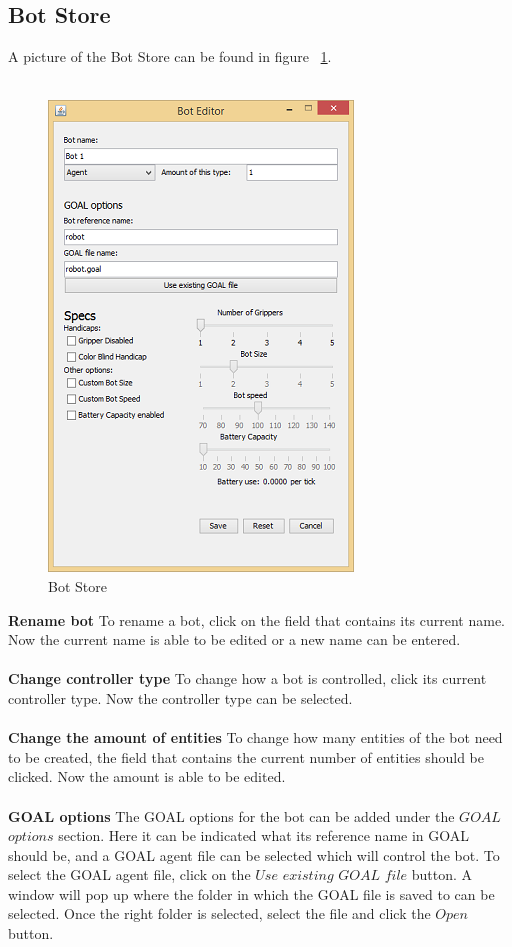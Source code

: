 \subsection{Bot Store}
A picture of the Bot Store can be found in figure ~\ref{fig:bs}.\\\\
\begin{figure}[h]
\begin{center}
\includegraphics{NewFeatures/bs.png}
\end{center}
\caption{Bot Store}
\label{fig:bs}
\end{figure}
\textbf{Rename bot}
To rename a bot, click on the field that contains its current name. Now the current name is able to be edited or a new name can be entered.
\\\\
\textbf{Change controller type}
To change how a bot is controlled, click its current controller type. Now the controller type can be selected.
\\\\
\textbf{Change the amount of entities}
To change how many entities of the bot need to be created, the field that contains the current number of entities should be clicked. Now the amount is able to be edited.
\\\\
\textbf{GOAL options}
The GOAL options for the bot can be added under the $GOAL$ $options$ section. Here it can be indicated what its reference name in GOAL should be, and a GOAL agent file can be selected which will control the bot. To select the GOAL agent file, click on the $Use$ $existing$ $GOAL$ $file$ button. A window will pop up where the folder in which the GOAL file is saved to can be selected. Once the right folder is selected, select the file and click the $Open$ button.
